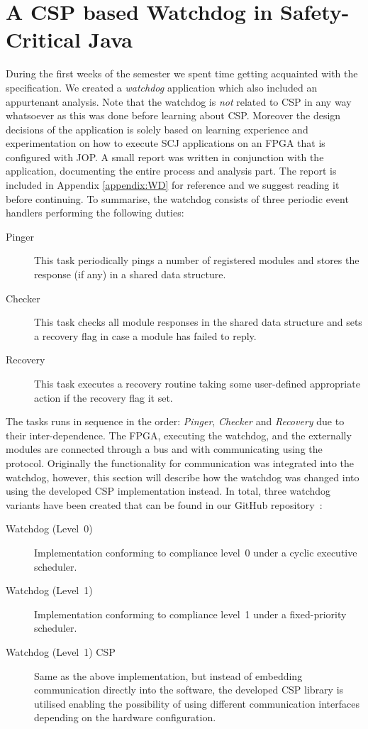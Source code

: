 \chapter{A CSP based Watchdog in Safety-Critical Java}
\label{chapter:watchdogcsp}
During the first weeks of the semester we spent time getting acquainted with the specification. We created a \textit{watchdog} application which also included an appurtenant analysis. Note that the watchdog is \textit{not} related to CSP in any way whatsoever as this was done before learning about CSP. Moreover the design decisions of the application is solely based on learning experience and experimentation on how to execute SCJ applications on an FPGA that is configured with JOP. A small report was written in conjunction with the application, documenting the entire process and analysis part. The report is included in Appendix \ref{appendix:WD} for reference and we suggest reading it before continuing. To summarise, the watchdog consists of three periodic event handlers performing the following duties:

\begin{description}
	\item[Pinger] This task periodically pings a number of registered modules and stores the response (if any) in a shared data structure.
	\item[Checker] This task checks all module responses in the shared data structure and sets a recovery flag in case a module has failed to reply.
	\item[Recovery] This task executes a recovery routine taking some user-defined appropriate action if the recovery flag it set. 
\end{description}

The tasks runs in sequence in the order: \textit{Pinger}, \textit{Checker} and \textit{Recovery} due to their inter-dependence. The FPGA, executing the watchdog, and the externally modules are connected through a bus and with communicating using the \iic protocol. Originally the functionality for \iic communication was integrated into the watchdog, however, this section will describe how the watchdog was changed into using the developed CSP implementation instead. In total, three watchdog variants have been created that can be found in our GitHub repository~\cite{SW902e12:CSPinSCJ}:

\begin{description}
	\item[Watchdog (Level~0)] Implementation conforming to compliance level~0 under a cyclic executive scheduler.
	\item[Watchdog (Level~1)] Implementation conforming to compliance level~1 under a fixed-priority scheduler. 
	\item[Watchdog (Level~1) CSP] Same as the above implementation, but instead of embedding \iic communication directly into the software, the developed CSP library is utilised enabling the possibility of using different communication interfaces depending on the hardware configuration.
\end{description}

